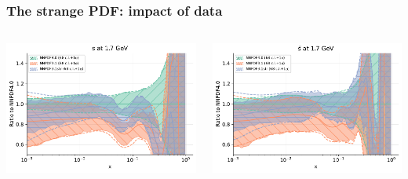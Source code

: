 \documentclass{beamer}
\begin{document}
\begin{frame}
 \frametitle{The strange PDF: impact of data}
 \footnotesize
 \centering
 \begin{columns}[c]
  \begin{column}{0.5\textwidth}
   \centering
   \includegraphics[width=\columnwidth]{plots/strange_1}\\
  \end{column}
  \begin{column}{0.5\textwidth}
   \centering
   \includegraphics[width=\columnwidth]{plots/strange_2}\\
  \end{column}
 \end{columns}
 \begin{columns}[c]
  \begin{column}{0.5\textwidth}
   \centering

\end{column}
\end{columns}
\end{frame}
\end{document}
